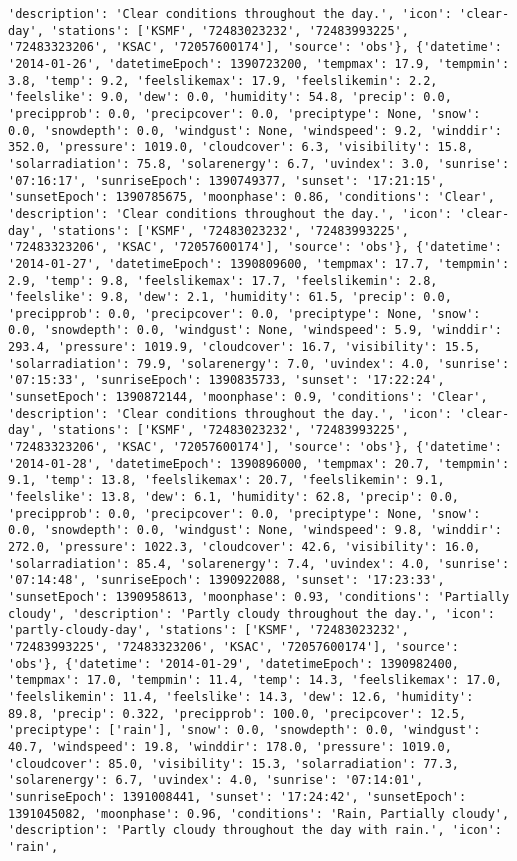 \documentclass[
  letterpaper,
  DIV=11,
  numbers=noendperiod]{scrartcl}
\begin{document}
\begin{verbatim}
'description': 'Clear conditions throughout the day.', 'icon': 'clear-day', 'stations': ['KSMF', '72483023232', '72483993225', '72483323206', 'KSAC', '72057600174'], 'source': 'obs'}, {'datetime': '2014-01-26', 'datetimeEpoch': 1390723200, 'tempmax': 17.9, 'tempmin': 3.8, 'temp': 9.2, 'feelslikemax': 17.9, 'feelslikemin': 2.2, 'feelslike': 9.0, 'dew': 0.0, 'humidity': 54.8, 'precip': 0.0, 'precipprob': 0.0, 'precipcover': 0.0, 'preciptype': None, 'snow': 0.0, 'snowdepth': 0.0, 'windgust': None, 'windspeed': 9.2, 'winddir': 352.0, 'pressure': 1019.0, 'cloudcover': 6.3, 'visibility': 15.8, 'solarradiation': 75.8, 'solarenergy': 6.7, 'uvindex': 3.0, 'sunrise': '07:16:17', 'sunriseEpoch': 1390749377, 'sunset': '17:21:15', 'sunsetEpoch': 1390785675, 'moonphase': 0.86, 'conditions': 'Clear', 'description': 'Clear conditions throughout the day.', 'icon': 'clear-day', 'stations': ['KSMF', '72483023232', '72483993225', '72483323206', 'KSAC', '72057600174'], 'source': 'obs'}, {'datetime': '2014-01-27', 'datetimeEpoch': 1390809600, 'tempmax': 17.7, 'tempmin': 2.9, 'temp': 9.8, 'feelslikemax': 17.7, 'feelslikemin': 2.8, 'feelslike': 9.8, 'dew': 2.1, 'humidity': 61.5, 'precip': 0.0, 'precipprob': 0.0, 'precipcover': 0.0, 'preciptype': None, 'snow': 0.0, 'snowdepth': 0.0, 'windgust': None, 'windspeed': 5.9, 'winddir': 293.4, 'pressure': 1019.9, 'cloudcover': 16.7, 'visibility': 15.5, 'solarradiation': 79.9, 'solarenergy': 7.0, 'uvindex': 4.0, 'sunrise': '07:15:33', 'sunriseEpoch': 1390835733, 'sunset': '17:22:24', 'sunsetEpoch': 1390872144, 'moonphase': 0.9, 'conditions': 'Clear', 'description': 'Clear conditions throughout the day.', 'icon': 'clear-day', 'stations': ['KSMF', '72483023232', '72483993225', '72483323206', 'KSAC', '72057600174'], 'source': 'obs'}, {'datetime': '2014-01-28', 'datetimeEpoch': 1390896000, 'tempmax': 20.7, 'tempmin': 9.1, 'temp': 13.8, 'feelslikemax': 20.7, 'feelslikemin': 9.1, 'feelslike': 13.8, 'dew': 6.1, 'humidity': 62.8, 'precip': 0.0, 'precipprob': 0.0, 'precipcover': 0.0, 'preciptype': None, 'snow': 0.0, 'snowdepth': 0.0, 'windgust': None, 'windspeed': 9.8, 'winddir': 272.0, 'pressure': 1022.3, 'cloudcover': 42.6, 'visibility': 16.0, 'solarradiation': 85.4, 'solarenergy': 7.4, 'uvindex': 4.0, 'sunrise': '07:14:48', 'sunriseEpoch': 1390922088, 'sunset': '17:23:33', 'sunsetEpoch': 1390958613, 'moonphase': 0.93, 'conditions': 'Partially cloudy', 'description': 'Partly cloudy throughout the day.', 'icon': 'partly-cloudy-day', 'stations': ['KSMF', '72483023232', '72483993225', '72483323206', 'KSAC', '72057600174'], 'source': 'obs'}, {'datetime': '2014-01-29', 'datetimeEpoch': 1390982400, 'tempmax': 17.0, 'tempmin': 11.4, 'temp': 14.3, 'feelslikemax': 17.0, 'feelslikemin': 11.4, 'feelslike': 14.3, 'dew': 12.6, 'humidity': 89.8, 'precip': 0.322, 'precipprob': 100.0, 'precipcover': 12.5, 'preciptype': ['rain'], 'snow': 0.0, 'snowdepth': 0.0, 'windgust': 40.7, 'windspeed': 19.8, 'winddir': 178.0, 'pressure': 1019.0, 'cloudcover': 85.0, 'visibility': 15.3, 'solarradiation': 77.3, 'solarenergy': 6.7, 'uvindex': 4.0, 'sunrise': '07:14:01', 'sunriseEpoch': 1391008441, 'sunset': '17:24:42', 'sunsetEpoch': 1391045082, 'moonphase': 0.96, 'conditions': 'Rain, Partially cloudy', 'description': 'Partly cloudy throughout the day with rain.', 'icon': 'rain', 
\end{verbatim}
\end{document}

